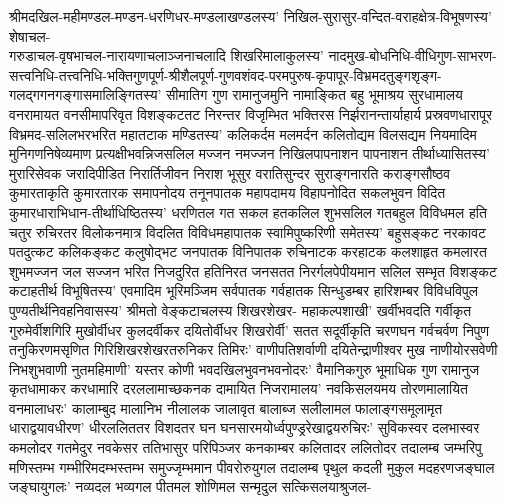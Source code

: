 
\begin{flushleft}
श्रीमदखिल-महीमण्डल-मण्डन-धरणिधर-मण्डलाखण्डलस्य'
निखिल-सुरासुर-वन्दित-वराहक्षेत्र-विभूषणस्य' शेषाचल-\\गरुडाचल-वृषभाचल-नारायणाचलाञ्जनाचलादि शिखरिमालाकुलस्य' नादमुख-बोधनिधि-वीधिगुण-साभरण-सत्त्वनिधि-तत्त्वनिधि-भक्तिगुणपूर्ण-श्रीशैलपूर्ण-गुणवशंवद-परमपुरुष-कृपापूर-विभ्रमदतुङ्गशृङ्ग-गलद्गगनगङ्गासमालिङ्गितस्य' सीमातिग गुण रामानुजमुनि नामाङ्कित बहु भूमाश्रय सुरधामालय
वनरामायत वनसीमापरिवृत विशङ्कटतट निरन्तर विजृम्भित भक्तिरस 
निर्झरानन्तार्याहार्य प्रस्रवणधारापूर विभ्रमद-सलिल\-भरभरित महातटाक मण्डितस्य' कलिकर्दम मलमर्दन कलितोद्यम विलसद्यम
नियमादिम मुनिगणनिषेव्यमाण प्रत्यक्षीभवन्निजसलिल मज्जन
नमज्जन निखिलपापनाशन पापनाशन तीर्थाध्यासितस्य'
मुरारिसेवक जरादिपीडित निरार्तिजीवन निराश भूसुर वरातिसुन्दर सुराङ्गनारति कराङ्गसौष्ठव कुमारताकृति कुमारतारक समापनोदय तनूनपातक महापदामय विहापनोदित सकलभुवन विदित कुमारधाराभिधान-तीर्थाधिष्ठितस्य' धरणितल गत सकल हतकलिल शुभसलिल गतबहुल विविधमल हति चतुर रुचिरतर विलोकनमात्र विदलित विविधमहापातक स्वामिपुष्करिणी समेतस्य' बहुसङ्कट
नरकावट पतदुत्कट कलिकङ्कट कलुषोद्भट जनपातक विनिपातक
रुचिनाटक करहाटक कलशाहृत कमलारत शुभमज्जन जल सज्जन भरित निजदुरित हतिनिरत जनसतत निरर्गलपेपीयमान सलिल
सम्भृत विशङ्कट कटाहतीर्थ विभूषितस्य' एवमादिम भूरिमञ्जिम
सर्वपातक गर्वहातक सिन्धुडम्बर हारिशम्बर विविधविपुल पुण्यतीर्थनिवहनिवासस्य' श्रीमतो वेङ्कटाचलस्य शिखरशेखर-%
महाकल्पशाखी' खर्वीभवदति गर्वीकृत गुरुमेर्वीशगिरि मुखोर्वीधर कुलदर्वीकर दयितोर्वीधर शिखरोर्वी' सतत सदूर्वीकृति चरणघन गर्वचर्वण निपुण तनुकिरणमसृणित गिरिशिखरशेखरतरुनिकर
तिमिरः' वाणीपतिशर्वाणी दयितेन्द्राणीश्वर मुख नाणीयोरसवेणी निभशुभवाणी नुतमहिमाणी' यस्तर कोणी भवदखिलभुवनभवनोदरः' वैमानिकगुरु भूमाधिक गुण रामानुज कृतधामाकर करधामारि दरललामाच्छकनक दामायित निजरामालय' नवकिसलयमय तोरणमालायित वनमालाधरः' कालाम्बुद मालानिभ नीलालक
जालावृत बालाब्ज सलीलामल फालाङ्गसमूलामृत धाराद्वयावधीरण' धीरललिततर विशदतर घन घनसारमयोर्ध्वपुण्ड्ररेखाद्वयरुचिरः' सुविकस्वर दलभास्वर कमलोदर गतमेदुर नवकेसर ततिभासुर परिपिञ्जर कनकाम्बर कलितादर ललितोदर तदालम्ब जम्भरिपु मणिस्तम्भ गम्भीरिमदम्भस्तम्भ समुज्जृम्भमान पीवरोरुयुगल
तदालम्ब पृथुल कदली मुकुल मदहरणजङ्घाल जङ्घायुगलः'
नव्यदल भव्यगल पीतमल शोणिमल सन्मृदुल सत्किसलयाश्रुजल-%

\end{flushleft}
